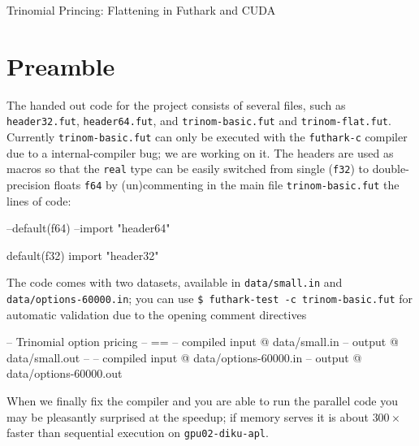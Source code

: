 \documentclass[a4paper,11pt]{article}
\newcommand{\fasto}{\textsc{Fasto}\xspace}
\begin{document}

\begin{center}

{\LARGE Trinomial Princing: Flattening in Futhark and CUDA}


\end{center}

\section*{Preamble}

The handed out code for the project consists of several files,
such as {\tt header32.fut}, {\tt header64.fut}, and 
{\tt trinom-basic.fut} and {\tt trinom-flat.fut}.
%
Currently {\tt trinom-basic.fut} can only be executed with 
the {\tt futhark-c} compiler due to a internal-compiler bug; 
we are working on it.  The headers are used as macros so
that the {\tt real} type can be easily switched from single ({\tt f32}) 
to double-precision floats {\tt f64} by (un)commenting in the main file 
{\tt trinom-basic.fut} the lines of code: 

\begin{fancycode}
--default(f64)
--import "header64"

default(f32)
import "header32"
\end{fancycode}

The code comes with two datasets, available in {\tt data/small.in}
and {\tt data/options-60000.in}; you can use 
{\tt \$ futhark-test -c trinom-basic.fut}
for automatic validation due to the opening comment directives

\begin{fancycode}
-- Trinomial option pricing
-- ==
-- compiled input @ data/small.in
-- output @ data/small.out
--
-- compiled input @ data/options-60000.in
-- output @ data/options-60000.out
\end{fancycode}

When we finally fix the compiler and you are able to run the parallel
code you may be pleasantly surprised at the speedup; if memory serves
it is about $300\times$ faster than sequential execution on 
{\tt gpu02-diku-apl}.
\end{document}
